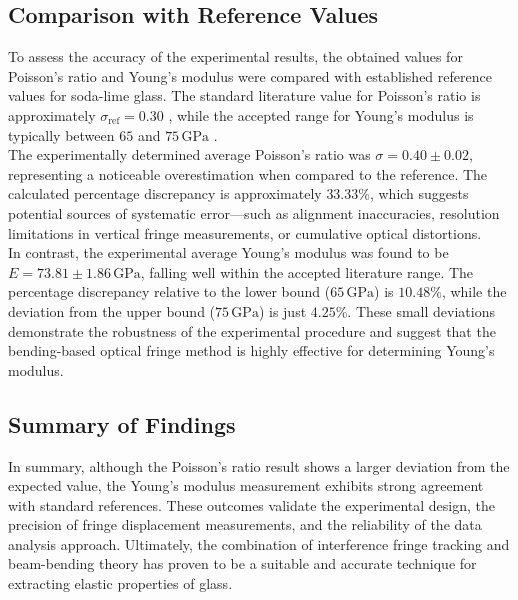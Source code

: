 \documentclass[a4paper,11pt]{article}
\begin{document}
\subsection{Comparison with Reference Values}
\noindent

To assess the accuracy of the experimental results, the obtained values for Poisson's ratio and Young's modulus were compared with established reference values for soda-lime glass. The standard literature value for Poisson's ratio is approximately \(\sigma_{\text{ref}} = 0.30\) \autocite{Li2025NegativePoisson}, while the accepted range for Young's modulus is typically between \(65\) and \(75\,\mathrm{GPa}\) \autocite{ElMoneim1998Elastic} \autocite{Sharpe2007Strain}.\\

The experimentally determined average Poisson's ratio was \(\sigma = 0.40 \pm 0.02\), representing a noticeable overestimation when compared to the reference. The calculated percentage discrepancy is approximately \(33.33\%\), which suggests potential sources of systematic error—such as alignment inaccuracies, resolution limitations in vertical fringe measurements, or cumulative optical distortions.\\

In contrast, the experimental average Young's modulus was found to be \(E = 73.81 \pm 1.86\,\mathrm{GPa}\), falling well within the accepted literature range. The percentage discrepancy relative to the lower bound (\(65\,\mathrm{GPa}\)) is \(10.48\%\), while the deviation from the upper bound (\(75\,\mathrm{GPa}\)) is just \(4.25\%\). These small deviations demonstrate the robustness of the experimental procedure and suggest that the bending-based optical fringe method is highly effective for determining Young's modulus.\\

\subsection{Summary of Findings}
\noindent 

In summary, although the Poisson's ratio result shows a larger deviation from the expected value, the Young's modulus measurement exhibits strong agreement with standard references. These outcomes validate the experimental design, the precision of fringe displacement measurements, and the reliability of the data analysis approach. Ultimately, the combination of interference fringe tracking and beam-bending theory has proven to be a suitable and accurate technique for extracting elastic properties of glass.\\
\end{document}
